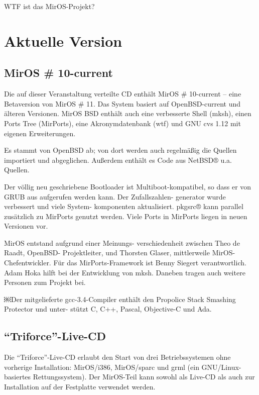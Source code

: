 \documentclass[
a4paper,%
notumble%
]{leaflet}
\begin{document}

{\centering\Large WTF ist das MirOS-Projekt?\par}

\newpage

\section{Aktuelle Version}

\subsection{MirOS \# 10-current}

Die auf dieser Veranstaltung verteilte CD enthält MirOS \# 10-current -- eine Betaversion von MirOS \# 11. Das System basiert auf OpenBSD-current und älteren Versionen. MirOS BSD enthält auch eine verbesserte Shell (mksh), einen Ports Tree (MirPorts), eine Akronymdatenbank (wtf) und GNU cvs 1.12 mit eigenen Erweiterungen.

Es stammt von OpenBSD ab; von dort werden auch regelmäßig die Quellen importiert und abgeglichen. Außerdem enthält es Code aus NetBSD® u.a. Quellen.

Der völlig neu geschriebene Bootloader ist Multiboot-kompatibel, so dass er von GRUB aus aufgerufen werden kann. Der Zufallszahlen- generator wurde verbessert und viele System- komponenten aktualisiert. pkgsrc® kann parallel zusätzlich zu MirPorts genutzt werden. Viele Ports in MirPorts liegen in neuen Versionen vor.

MirOS entstand aufgrund einer Meinungs- verschiedenheit zwischen Theo de Raadt, OpenBSD- Projektleiter, und Thorsten Glaser, mittlerweile MirOS- Chefentwickler. Für das MirPorts-Framework ist Benny Siegert verantwortlich. Adam Hoka hilft bei der Entwicklung von mksh. Daneben tragen auch weitere Personen zum Projekt bei.

￼Der mitgelieferte gcc-3.4-Compiler enthält den Propolice Stack Smashing Protector und unter- stützt C, C++, Pascal, Objective-C und Ada.

\subsection{"`Triforce"'-Live-CD}

Die "`Triforce"'-Live-CD erlaubt den Start von drei Betriebssystemen ohne vorherige Installation: MirOS/i386, MirOS/sparc und grml (ein GNU/Linux-basiertes Rettungssystem). Der MirOS-Teil kann sowohl als Live-CD als auch zur Installation auf der Festplatte verwendet werden.
\end{document}

